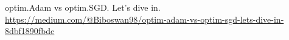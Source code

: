 \documentclass[journal, a4paper]{IEEEtran}
\begin{document}
\begin{thebibliography}{999}

    	optim.Adam vs optim.SGD. Let’s dive in.
    	\url{https://medium.com/@Biboswan98/optim-adam-vs-optim-sgd-lets-dive-in-8dbf1890fbdc}
	
	    

\end{thebibliography}

\end{document}
